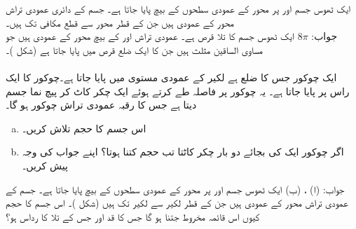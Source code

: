 ایک ٹھوس جسم  اور  پر   محور کے عمودی سطحوں کے بیچ پایا جاتا ہے۔ جسم کے دائری عمودی تراش  محور کے عمودی ہیں جن کے قطر  محور سے قطع مکافی  تک ہیں۔\\
جواب:\quad
$8\pi$
ایک ٹھوس جسم کا تلا قرص  ہے۔ عمودی تراش     اور  کے بیچ  محور کے عمودی ہیں جو مساوی الساقین مثلث ہیں جن کا ایک ضلع قرص میں پایا جاتا ہے (شکل )۔
\\
\\
ایک چوکور جس کا ضلع  ہے لکیر  کے عمودی مستوی میں پایا جاتا ہے۔چوکور کا ایک راس  پر پایا جاتا ہے۔ یہ چوکور  پر  فاصلہ طے کرتے ہوئے ایک چکر کاٹ کر پیچ نما جسم دیتا ہے جس کا رقبہ عمودی تراش چوکور ہو گا۔
\begin{enumerate}[a.]
\item
اس جسم کا حجم تلاش کریں۔
\item
اگر چوکور ایک کی بجائے دو بار چکر کاٹتا تب حجم کتنا ہوتا؟ اپنے جواب کی وجہ پیش کریں۔ 
\end{enumerate} 
جواب:\quad
(ا) ، (ب) 
ایک ٹھوس جسم  اور  پر   محور کے عمودی سطحوں کے بیچ پایا جاتا ہے۔ جسم کے عمودی تراش  محور کے عمودی ہیں جن کے  قطر لکیر  سے لکیر  تک ہیں (شکل )۔ اس جسم کا حجم کیوں اس قائمہ مخروط جتنا ہو گا جس کا قد  اور جس کے تلا کا رداس  ہو؟ 
